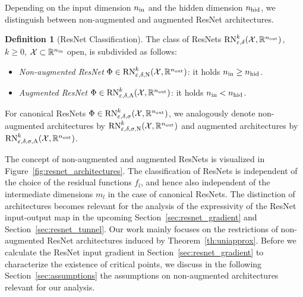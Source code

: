 \documentclass[10pt]{article}
\theoremstyle{definition}
\newtheorem{definition}[theorem]{Definition}
\numberwithin{equation}{section}
\newcommand{\eps}{\varepsilon}
\newcommand{\R}{\mathbb{R}}
\newcommand*{\nout}{n_\textup{out}}
\newcommand*{\nhid}{n_\textup{hid}}
\newcommand*{\nin}{n_\textup{in}}
\newcommand*{\RN}{\textup{RN}_{\eps,\delta}^k(\mathcal{X},\R^{\nout})}
\begin{document}
Depending on the input dimension $\nin$ and the hidden dimension $\nhid$, we distinguish between non-augmented and augmented ResNet architectures.

\begin{definition}[ResNet Classification]\label{def:resnet_classes}
	The class of ResNets $\RN$, $k \geq 0$, $\mathcal{X}\subset \R^{\nin}$ open, is subdivided as follows:
	\begin{itemize}
		\item \emph{Non-augmented ResNet} $\Phi \in \textup{RN}_{\eps,\delta,\textup{N}}^k(\mathcal{X},\R^{\nout})$: it holds $\nin \geq \nhid$. 
		\item \emph{Augmented ResNet} $\Phi \in \textup{RN}_{\eps,\delta,\textup{A}}^k(\mathcal{X},\R^{\nout})$: it holds $\nin < \nhid$. 
	\end{itemize}
	For canonical ResNets $\Phi \in \textup{RN}_{\eps,\delta,\sigma}^k(\mathcal{X},\R^{\nout})$, we analogously denote non-augmented architectures by $\textup{RN}_{\eps,\delta,\sigma,\textup{N}}^k(\mathcal{X},\R^{\nout})$ and augmented architectures by $\textup{RN}_{\eps,\delta,\sigma,\textup{A}}^k(\mathcal{X},\R^{\nout})$.
\end{definition}

The concept of non-augmented and augmented ResNets is visualized in Figure~\ref{fig:resnet_architectures}. The classification of ResNets is independent of the choice of the residual functions $f_l$, and hence also independent of the intermediate dimensions $m_l$ in the case of canonical ResNets. The distinction of architectures becomes relevant for the analysis of the expressivity of the ResNet input-output map in the upcoming Section~\ref{sec:resnet_gradient} and Section~\ref{sec:resnet_tunnel}. Our work mainly focuses on the restrictions of non-augmented ResNet architectures induced by Theorem~\ref{th:uniapprox}. Before we calculate the ResNet input gradient in Section~\ref{sec:resnet_gradient} to characterize the existence of critical points, we discuss in the following  Section~\ref{sec:assumptions} the assumptions on non-augmented architectures relevant for our analysis. 
\end{document}
